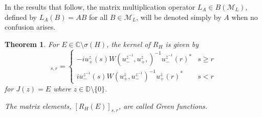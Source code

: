 \documentclass[12pt,oneside,onecolumn,open]{article}
\newtheorem{teo}{Theorem}[section]
\begin{document}
In the results that follow, the matrix multiplication operator $L_A \in B(\mathcal{M}_L)$, defined by $L_A(B) = AB$ for all $B \in \mathcal{M}_L$, will be denoted simply by $A$ when no confusion arises.
\color{black}
\begin{teo}\label{formulaGreenmatrixelements}
    For  $E\in \mathbb{C}\setminus \sigma (H)$, the kernel of $R_{H}$ is given by
    \begin{equation}
    [R_{H}(E)]_{s,r}=
    \label{eq:Green}
 \left\{ \begin{array}{lcc}
               -iu_{+}^{z}(s) W(u_{-}^{\overline{z}^{-1}},u_{+}^{z},)^{-1} u_{-}^{\overline{z}^{-1}}(r)^{*} &   s\geq r \\
            iu_{-}^{z^{-1}}(s) W(u_{+}^{\overline{z}}, u_{-}^{z^{-1}})^{-1} u_{+}^{\overline{z}}(r)^{*} &  s< r
             \end{array}
   \right.
   \end{equation}
   for $J(z)=E$ where $z\in \mathbb{D}\setminus \{0\}$. 
   
   The matrix elements, $[R_{H}(E)]_{s,r}$, are called Green functions.
\end{teo}
\end{document}
